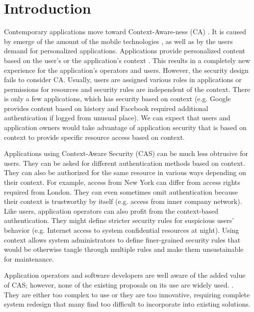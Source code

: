 \documentclass{sig-alternate}
\begin{document}



\section{Introduction}
Contemporary applications move toward Context-Aware-ness (CA) \cite{context,tomas1}. It is caused by emerge of the amount of the mobile technologies \cite{mobilecontext}, as well as by the users demand for personalized applications. Applications provide personalized content based on the user's or the application's context \cite{personalizedcontext}. This results in a completely new experience for the application's operators and users. However, the security design fails to consider CA. Usually, users are assigned various roles in applications or permissions for resources and security rules are independent of the context. There is only a few applications, which has security based on context (e.g. Google provides content based on history and Facebook required additional authentication if logged from unusual place). We can expect that users and application owners would take advantage of application security that is based on context to provide specific resource access based on context.

Applications using Context-Aware Security (CAS) can be much less obtrusive for users. They can be asked for different authentication methods based on context. They can also be authorized for the same resource in various ways depending on their context. For example, access from New York can differ from access rights required from London. They can even sometimes omit authentication because their context is trustworthy by itself (e.g. access from inner company network). Like users, application operators can also profit from the context-based authentication. They might define stricter security rules for suspicious users' behavior (e.g. Internet access to system confidential resources at night). Using context allows system administrators to define finer-grained security rules that would be otherwise tangle through multiple rules and make them unsustainable for maintenance. 

Application operators and software developers are well aware of the added value of CAS; however, none of the existing proposals on its use are widely used. \cite{ubiscom,envroles,hung,contextawarerbac,genericcontext,contextAwareMobile,grbac,xorbac,contextroles,eacl,contextaccess,wendong}. They are either too complex to use or they are too innovative, requiring complete system redesign that many find too difficult to incorporate into existing solutions.
\end{document}
